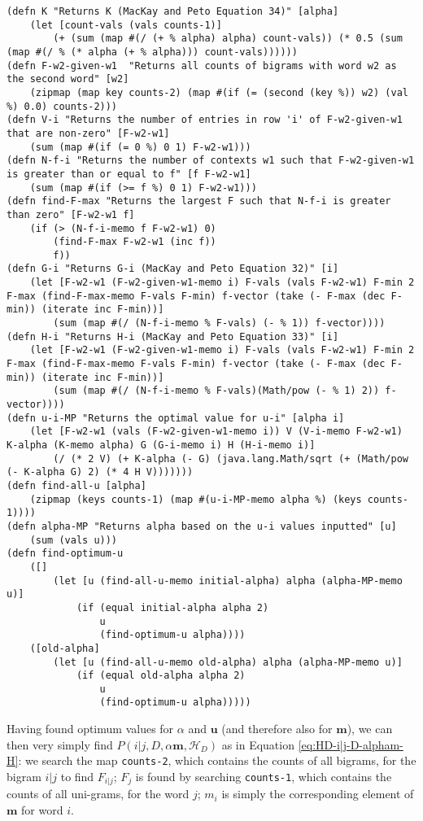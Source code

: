\begin{lstlisting}
(defn K "Returns K (MacKay and Peto Equation 34)" [alpha] 
	(let [count-vals (vals counts-1)] 
		(+ (sum (map #(/ (+ % alpha) alpha) count-vals)) (* 0.5 (sum (map #(/ % (* alpha (+ % alpha))) count-vals))))))
(defn F-w2-given-w1  "Returns all counts of bigrams with word w2 as the second word" [w2] 
	(zipmap (map key counts-2) (map #(if (= (second (key %)) w2) (val %) 0.0) counts-2)))
(defn V-i "Returns the number of entries in row 'i' of F-w2-given-w1 that are non-zero" [F-w2-w1] 
	(sum (map #(if (= 0 %) 0 1) F-w2-w1)))
(defn N-f-i "Returns the number of contexts w1 such that F-w2-given-w1 is greater than or equal to f" [f F-w2-w1] 
	(sum (map #(if (>= f %) 0 1) F-w2-w1)))
(defn find-F-max "Returns the largest F such that N-f-i is greater than zero" [F-w2-w1 f] 
	(if (> (N-f-i-memo f F-w2-w1) 0) 
		(find-F-max F-w2-w1 (inc f)) 
		f))
(defn G-i "Returns G-i (MacKay and Peto Equation 32)" [i] 
	(let [F-w2-w1 (F-w2-given-w1-memo i) F-vals (vals F-w2-w1) F-min 2 F-max (find-F-max-memo F-vals F-min) f-vector (take (- F-max (dec F-min)) (iterate inc F-min))] 
		(sum (map #(/ (N-f-i-memo % F-vals) (- % 1)) f-vector))))
(defn H-i "Returns H-i (MacKay and Peto Equation 33)" [i] 
	(let [F-w2-w1 (F-w2-given-w1-memo i) F-vals (vals F-w2-w1) F-min 2 F-max (find-F-max-memo F-vals F-min) f-vector (take (- F-max (dec F-min)) (iterate inc F-min))] 
		(sum (map #(/ (N-f-i-memo % F-vals)(Math/pow (- % 1) 2)) f-vector))))
(defn u-i-MP "Returns the optimal value for u-i" [alpha i] 
	(let [F-w2-w1 (vals (F-w2-given-w1-memo i)) V (V-i-memo F-w2-w1) K-alpha (K-memo alpha) G (G-i-memo i) H (H-i-memo i)] 
		(/ (* 2 V) (+ K-alpha (- G) (java.lang.Math/sqrt (+ (Math/pow (- K-alpha G) 2) (* 4 H V)))))))
(defn find-all-u [alpha] 
	(zipmap (keys counts-1) (map #(u-i-MP-memo alpha %) (keys counts-1))))
(defn alpha-MP "Returns alpha based on the u-i values inputted" [u] 
	(sum (vals u)))
(defn find-optimum-u 
	([] 
		(let [u (find-all-u-memo initial-alpha) alpha (alpha-MP-memo u)] 
			(if (equal initial-alpha alpha 2) 
				u 
				(find-optimum-u alpha)))) 
	([old-alpha] 
		(let [u (find-all-u-memo old-alpha) alpha (alpha-MP-memo u)] 
			(if (equal old-alpha alpha 2) 
				u 
				(find-optimum-u alpha)))))
\end{lstlisting}

Having found optimum values for $\alpha$ and $\boldsymbol{u}$ (and therefore also for $\boldsymbol{m}$), we can then very simply find $P(i|j,D,\alpha\boldsymbol{m},\mathscr{H}_{D})$ as in Equation \ref{eq:HD-i|j-D-alpham-H}: we search the map \lstinline!counts-2!, which contains the counts of all bigrams, for the bigram $i|j$ to find $F_{i|j}$; $F_{j}$ is found by searching \lstinline!counts-1!, which contains the counts of all uni-grams, for the word $j$; $m_{i}$ is simply the corresponding element of $\boldsymbol{m}$ for word $i$.


